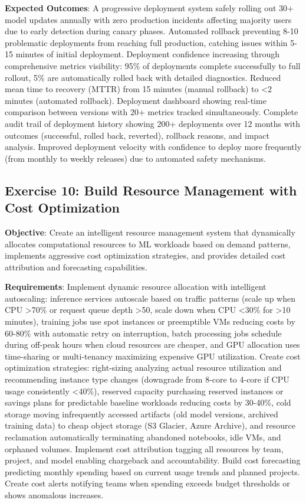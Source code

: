 \textbf{Expected Outcomes}: A progressive deployment system safely rolling out 30+ model updates annually with zero production incidents affecting majority users due to early detection during canary phases. Automated rollback preventing 8-10 problematic deployments from reaching full production, catching issues within 5-15 minutes of initial deployment. Deployment confidence increasing through comprehensive metrics visibility: 95\% of deployments complete successfully to full rollout, 5\% are automatically rolled back with detailed diagnostics. Reduced mean time to recovery (MTTR) from 15 minutes (manual rollback) to <2 minutes (automated rollback). Deployment dashboard showing real-time comparison between versions with 20+ metrics tracked simultaneously. Complete audit trail of deployment history showing 200+ deployments over 12 months with outcomes (successful, rolled back, reverted), rollback reasons, and impact analysis. Improved deployment velocity with confidence to deploy more frequently (from monthly to weekly releases) due to automated safety mechanisms.

\subsection{Exercise 10: Build Resource Management with Cost Optimization}

\textbf{Objective}: Create an intelligent resource management system that dynamically allocates computational resources to ML workloads based on demand patterns, implements aggressive cost optimization strategies, and provides detailed cost attribution and forecasting capabilities.

\textbf{Requirements}: Implement dynamic resource allocation with intelligent autoscaling: inference services autoscale based on traffic patterns (scale up when CPU >70\% or request queue depth >50, scale down when CPU <30\% for >10 minutes), training jobs use spot instances or preemptible VMs reducing costs by 60-80\% with automatic retry on interruption, batch processing jobs schedule during off-peak hours when cloud resources are cheaper, and GPU allocation uses time-sharing or multi-tenancy maximizing expensive GPU utilization. Create cost optimization strategies: right-sizing analyzing actual resource utilization and recommending instance type changes (downgrade from 8-core to 4-core if CPU usage consistently <40\%), reserved capacity purchasing reserved instances or savings plans for predictable baseline workloads reducing costs by 30-40\%, cold storage moving infrequently accessed artifacts (old model versions, archived training data) to cheap object storage (S3 Glacier, Azure Archive), and resource reclamation automatically terminating abandoned notebooks, idle VMs, and orphaned volumes. Implement cost attribution tagging all resources by team, project, and model enabling chargeback and accountability. Build cost forecasting predicting monthly spending based on current usage trends and planned projects. Create cost alerts notifying teams when spending exceeds budget thresholds or shows anomalous increases.

